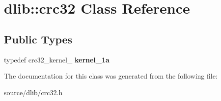 \hypertarget{classdlib_1_1crc32}{
\section{dlib::crc32 Class Reference}
\label{classdlib_1_1crc32}
}
\subsection*{Public Types}
\begin{DoxyCompactItemize}
\item 
\hypertarget{classdlib_1_1crc32_ad29669d6f6595828c30aee9244ec6f91}{
typedef crc32\_\-kernel\_ {\bfseries kernel\_\-1a}}
\label{classdlib_1_1crc32_ad29669d6f6595828c30aee9244ec6f91}

\end{DoxyCompactItemize}


The documentation for this class was generated from the following file:\begin{DoxyCompactItemize}
\item 
source/dlib/crc32.h\end{DoxyCompactItemize}
